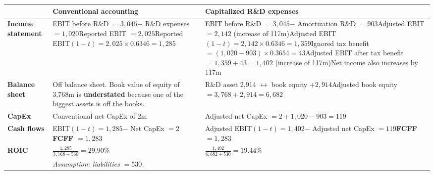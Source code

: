 \begin{exbox}[SAP: conventional accounting vs capitalized R\&D ($t=36.54\%$)]
\small
\begin{tabularx}{\linewidth}{@{}>{\bfseries}p{2.1cm}XX@{}}
\toprule
& \textbf{\color{keyred}Conventional accounting} & \textbf{\color{keyred}Capitalized R\&D expenses}\\
\midrule
Income statement & EBIT before R\&D $=3{,}045$\newline $-$ R\&D expenses $=1{,}020$\newline Reported EBIT $=2{,}025$\newline Reported EBIT$(1-t)=2{,}025\times0.6346=1{,}285$ & EBIT before R\&D $=3{,}045$\newline $-$ Amortization R\&D $=903$\newline Adjusted EBIT $=2{,}142$ (increase of 117m)\newline Adjusted EBIT$(1-t)=2{,}142\times0.6346=1{,}359$\newline Ignored tax benefit $=(1{,}020-903)\times0.3654=43$\newline Adjusted EBIT after tax benefit $=1{,}359+43=1{,}402$ (increase of 117m)\newline Net income also increases by 117m\\
\midrule
Balance sheet & Off balance sheet. Book value of equity of 3,768m is \textbf{understated} because one of the biggest assets is off the books. & R\&D asset 2,914 $\leftrightarrow$ book equity $+2{,}914$\newline Adjusted book equity $=3{,}768+2{,}914=6{,}682$\\
\midrule
CapEx & Conventional net CapEx of 2m & Adjusted net CapEx $=2+1{,}020-903=119$\\
\midrule
Cash flows & EBIT$(1-t)=1{,}285$\newline $-$ Net CapEx $=2$\newline \textbf{FCFF $=1{,}283$} & Adjusted EBIT$(1-t)=1{,}402$\newline $-$ Adjusted net CapEx $=119$\newline \textbf{FCFF $=1{,}283$}\\
\midrule
ROIC & $\frac{1{,}285}{3{,}768+530}=\mathbf{29.90\%}$ & $\frac{1{,}402}{6{,}682+530}=\mathbf{19.44\%}$\\
& \multicolumn{2}{l}{\emph{Assumption: liabilities $=530$.}}\\
\bottomrule
\end{tabularx}
\end{exbox}

